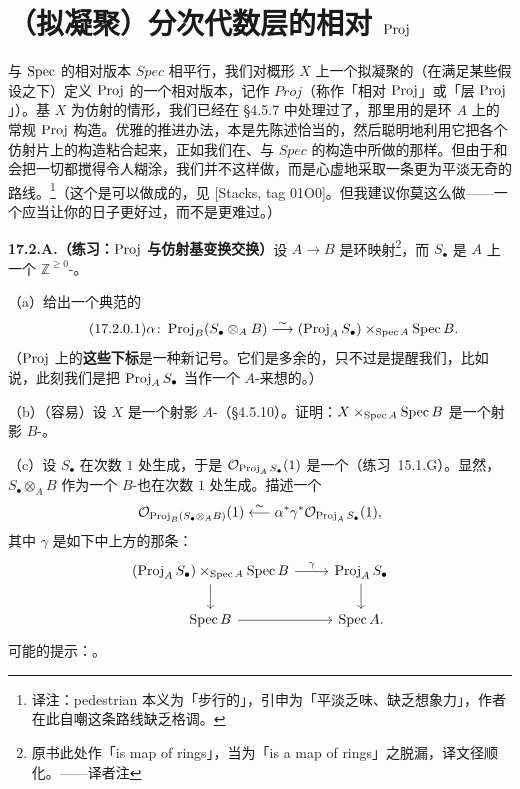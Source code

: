 
\section{（拟凝聚）分次代数层的相对 $\operatorname{Proj}$}

与 $\operatorname{Spec}$ 的相对版本 $\mathit{Spec}$ 相平行，我们对概形 $X$ 上一个拟凝聚的\trSheafOfGradedAlgebras（在满足某些假设之下）定义 $\operatorname{Proj}$ 的一个相对版本，记作 $\mathit{Proj}$（称作「相对 $\operatorname{Proj}$」或「层 $\operatorname{Proj}$」）。基 $X$ 为仿射的情形，我们已经在 \S4.5.7 中处理过了，那里用的是环 $A$ 上的常规 $\operatorname{Proj}$ 构造。优雅的推进办法，本是先陈述恰当的\trUniversalProperty，然后聪明地利用它把各个仿射片上的构造粘合起来，正如我们在\trFiberProduct、\trNormalization{}与 $\mathit{Spec}$ 的构造中所做的那样。但由于\trGradedRing{}和\trGradedModule{}会把一切都搅得令人糊涂，我们并不这样做，而是心虚地采取一条更为平淡无奇的路线。\footnote{译注：pedestrian 本义为「步行的」，引申为「平淡乏味、缺乏想象力」，作者在此自嘲这条路线缺乏格调。}（这个\trUniversalProperty{}是可以做成的，见 [Stacks, tag 01O0]。但我建议你莫这么做——一个\trUniversalProperty{}应当让你的日子更好过，而不是更难过。）

\textbf{17.2.A.（练习：$\operatorname{Proj}$ 与仿射基变换交换）}\quad 设 $A\to B$ 是环映射\footnote{原书此处作「is map of rings」，当为「is a map of rings」之脱漏，译文径顺化。——译者注}，而 $S_\bullet$ 是 $A$ 上一个 $\mathbb{Z}^{\ge0}$-\trGradedRing。

（a）给出一个典范的\trIsomorphism
\begin{equation*}\tag{17.2.0.1}\label{eq:relproj-affine-base-change}
\alpha\colon\operatorname{Proj}_B(S_\bullet\otimes_A B)\overset{\sim}{\longrightarrow}(\operatorname{Proj}_A S_\bullet)\times_{\operatorname{Spec} A}\operatorname{Spec} B.
\end{equation*}
（$\operatorname{Proj}$ 上的\textbf{这些下标}是一种新记号。它们是多余的，只不过是提醒我们，比如说，此刻我们是把 $\operatorname{Proj}_A S_\bullet$ 当作一个 $A$-\trScheme{}来想的。）

（b）（容易）设 $X$ 是一个射影 $A$-\trScheme（\S4.5.10）。证明：$X\times_{\operatorname{Spec} A}\operatorname{Spec} B$ 是一个射影 $B$-\trScheme。

（c）设 $S_\bullet$ 在次数 $1$ 处生成，于是 $\mathcal{O}_{\operatorname{Proj}_A S_\bullet}(1)$ 是一个\trInvertibleSheaf（\mbox{练习~15.1.G}）。显然，$S_\bullet\otimes_A B$ 作为一个 $B$-\trAlgebra{}也在次数 $1$ 处生成。描述一个\trIsomorphism
\[
\mathcal{O}_{\operatorname{Proj}_B(S_\bullet\otimes_A B)}(1)\overset{\sim}{\longleftarrow}\alpha^*\gamma^*\mathcal{O}_{\operatorname{Proj}_A S_\bullet}(1),
\]
其中 $\gamma$ 是如下\trCartesianDiagram{}中上方的那条\trMorphism：
\[
\begin{tikzcd}
(\Proj_A S_\bullet)\times_{\Spec A}\Spec B \ar[r, "\gamma"] \ar[d] & \Proj_A S_\bullet \ar[d] \\
\Spec B \ar[r] & \Spec A.
\end{tikzcd}
\]
可能的提示：\trTransitionFunction。

